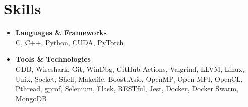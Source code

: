 \documentclass[letterpaper,11pt]{article}
\newcommand{\resumeItem}[2]{
  \item\small{
    \textbf{#1}{\\ #2 \vspace{-2pt}}
  }
}
\newcommand{\resumeSubItem}[2]{\resumeItem{#1}{#2}\vspace{-4pt}}
\newcommand{\resumeSubHeadingListStart}{\begin{itemize}[leftmargin=*]}
\newcommand{\resumeSubHeadingListEnd}{\end{itemize}}
\begin{document}
\section{Skills}
  \resumeSubHeadingListStart
  \resumeSubItem{Languages \& Frameworks}
    {C, C++, Python, CUDA, PyTorch}
  \resumeSubItem{Tools \& Technologies}
    {GDB, Wireshark, Git, WinDbg, GitHub Actions, Valgrind, LLVM,
     Linux, Unix, Socket, Shell, Makefile, Boost.Asio, OpenMP, Open MPI, OpenCL, Pthread, gprof, Selenium,
     Flask, RESTful, Jest, Docker, Docker Swarm, MongoDB}
  \resumeSubHeadingListEnd

\end{document}
